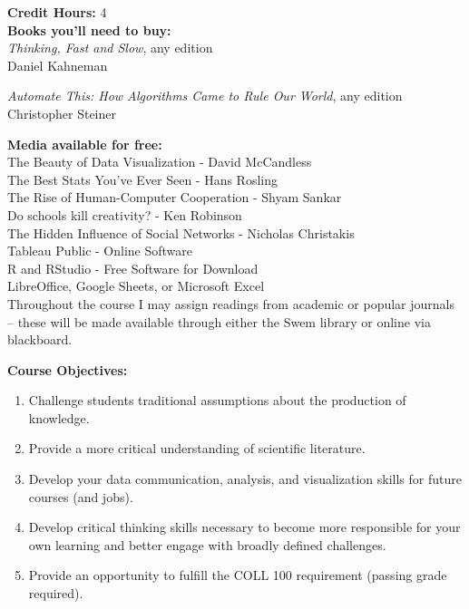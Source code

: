 \documentclass[11pt]{article}
\begin{document}
\textbf {Credit Hours:} 4 \\

\textbf {\large Books you'll need to buy:}\\ \emph{Thinking, Fast and Slow}, any edition \\
Daniel Kahneman 
\vspace{2mm}

\emph{Automate This: How Algorithms Came to Rule Our World}, any edition \\
Christopher Steiner
\vspace{2mm}

\textbf {\large Media available for free:}\\

The Beauty of Data Visualization - David McCandless \\
The Best Stats You’ve Ever Seen - Hans Rosling \\
The Rise of Human-Computer Cooperation - Shyam Sankar\\
Do schools kill creativity? - Ken Robinson \\
The Hidden Influence of Social Networks - Nicholas Christakis\\
Tableau Public - Online Software\\
R and RStudio - Free Software for Download\\
LibreOffice, Google Sheets, or Microsoft Excel\\

Throughout the course I may assign readings from academic or popular journals – these will be made available through either the Swem library or online via blackboard.

\vspace{8mm}

\textbf {\large Course Objectives:} 
\begin{enumerate} \itemsep-0.4em
  \item Challenge students traditional assumptions about the production of knowledge.
  \item Provide a more critical understanding of scientific literature.
  \item Develop your data communication, analysis, and visualization skills for future courses (and jobs).
  \item Develop critical thinking skills necessary to become more responsible for your own learning and better engage with broadly defined challenges.
  \item Provide an opportunity to fulfill the COLL 100 requirement (passing grade required).
\end{enumerate}
\vspace{8mm}
\end{document}
